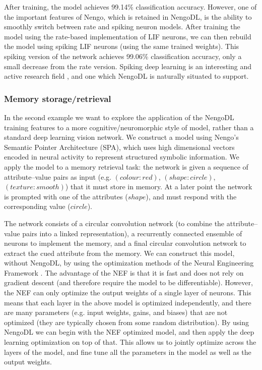 \documentclass{article}
\begin{document}
After training, the model achieves 99.14\% classification accuracy.  However, one of the important features of Nengo, which is retained in NengoDL, is the ability to smoothly switch between rate and spiking neuron models.  After training the model using the rate-based implementation of LIF neurons, we can then rebuild the model using spiking LIF neurons (using the same trained weights).  This spiking version of the network achieves 99.06\% classification accuracy, only a small decrease from the rate version.  Spiking deep learning is an interesting and active research field \citep{Hunsberger2015,Lee2016}, and one which NengoDL is naturally situated to support.

\subsubsection{Memory storage/retrieval}

In the second example we want to explore the application of the NengoDL training features to a more cognitive/neuromorphic style of model, rather than a standard deep learning vision network.  We construct a model using Nengo's Semantic Pointer Architecture (SPA), which uses high dimensional vectors encoded in neural activity to represent structured symbolic information.  We apply the model to a memory retrieval task: the network is given a sequence of attribute--value pairs as input (e.g. $(colour: red)$, $(shape: circle)$, $(texture: smooth)$) that it must store in memory.  At a later point the network is prompted with one of the attributes ($shape$), and must respond with the corresponding value ($circle$).  

The network consists of a circular convolution network (to combine the attribute--value pairs into a linked representation), a recurrently connected ensemble of neurons to implement the memory, and a final circular convolution network to extract the cued attribute from the memory.  We can construct this model, without NengoDL, by using the optimization methods of the Neural Engineering Framework \citep[NEF;][]{Eliasmith2005}.  The advantage of the NEF is that it is fast and does not rely on gradient descent (and therefore require the model to be differentiable).  However, the NEF can only optimize the output weights of a single layer of neurons.  This means that each layer in the above model is optimized independently, and there are many parameters (e.g. input weights, gains, and biases) that are not optimized (they are typically chosen from some random distribution).  By using NengoDL we can begin with the NEF optimized model, and then apply the deep learning optimization on top of that.  This allows us to jointly optimize across the layers of the model, and fine tune all the parameters in the model as well as the output weights.
\end{document}
